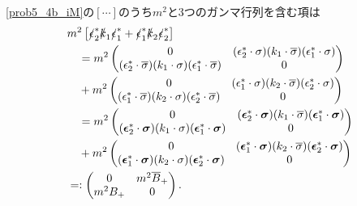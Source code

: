 \eqref{prob5_4b_iM}の$[\cdots]$のうち$m^2$と3つのガンマ行列を含む項は
\begin{align*}
  & m^2\left[ \slashed{\epsilon}_2^\ast\slashed{k}_1\slashed{\epsilon}_1^\ast + \slashed{\epsilon}_1^\ast\slashed{k}_2\slashed{\epsilon}_2^\ast \right] \\
  &\quad = m^2
  \begin{pmatrix}
    0 & (\epsilon_2^\ast \cdot \sigma)(k_1 \cdot \overline\sigma)(\epsilon_1^\ast \cdot \sigma) \\
    (\epsilon_2^\ast \cdot \overline\sigma)(k_1 \cdot \sigma)(\epsilon_1^\ast \cdot \overline\sigma) & 0
  \end{pmatrix}
  \\
  & \quad + m^2
  \begin{pmatrix}
    0 & (\epsilon_1^\ast \cdot \sigma)(k_2 \cdot \overline\sigma)(\epsilon_2^\ast \cdot \sigma) \\
    (\epsilon_1^\ast \cdot \overline\sigma)(k_2 \cdot \sigma)(\epsilon_2^\ast \cdot \overline\sigma) & 0
  \end{pmatrix}
  \\
  &\quad = m^2
  \begin{pmatrix}
    0 & (\boldsymbol{\epsilon}_2^\ast \cdot \boldsymbol\sigma)(k_1 \cdot \overline\sigma)(\boldsymbol{\epsilon}_1^\ast \cdot \boldsymbol\sigma) \\
    (\boldsymbol{\epsilon}_2^\ast \cdot \boldsymbol\sigma)(k_1 \cdot \sigma)(\boldsymbol{\epsilon}_1^\ast \cdot \boldsymbol\sigma) & 0
  \end{pmatrix}
  \\
  & \quad + m^2
  \begin{pmatrix}
    0 & (\boldsymbol{\epsilon}_1^\ast \cdot \boldsymbol\sigma)(k_2 \cdot \overline\sigma)(\boldsymbol{\epsilon}_2^\ast \cdot \boldsymbol\sigma) \\
    (\boldsymbol{\epsilon}_1^\ast \cdot \boldsymbol\sigma)(k_2 \cdot \sigma)(\boldsymbol{\epsilon}_2^\ast \cdot \boldsymbol\sigma) & 0
  \end{pmatrix}
  \\
  &=:
  \begin{pmatrix}
    0 & m^2\overline{B}_+ \\
    m^2 B_+ & 0
  \end{pmatrix}
  .
\end{align*}

